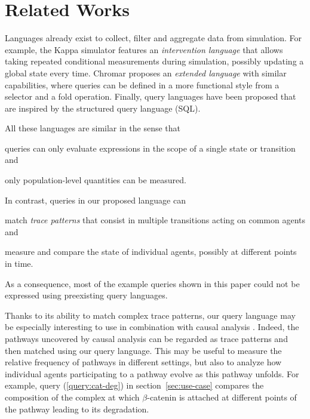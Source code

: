 \section{Related Works}

Languages already exist to collect, filter and aggregate data from
simulation. For example, the Kappa simulator \cite{BoutillierEK17}
features an \emph{intervention language} that allows taking repeated
conditional measurements during simulation, possibly updating a global
state every time. Chromar \cite{honorato2017chromar} proposes an
\emph{extended language} with similar capabilities, where queries can
be defined in a more functional style from a selector and a fold
operation. Finally, query languages have been proposed
\cite{helms2012toward,zehe2016online} that are inspired by the
{structured query language} (\textsc{SQL}).

All these languages are similar in the sense that
\begin{inparaenum}[(i)]
\item queries can only evaluate expressions in the scope of a single
state or transition and
\item only population-level quantities can be measured.
\end{inparaenum}
In contrast, queries in our proposed language can
\begin{inparaenum}[(i)]
\item match \emph{trace patterns} that consist in multiple transitions
  acting on common agents and
\item measure and compare the state of individual agents, possibly at
  different points in time.
\end{inparaenum}
As a consequence, most of the example queries shown in this paper
could not be expressed using preexisting query languages.

Thanks to its ability to match complex trace patterns, our query
language may be especially interesting to use in combination with
causal analysis
\cite{DanosEtAl-CONCUR07,DBLP:conf/fsttcs/DanosFFHH12}. Indeed, the
pathways uncovered by causal analysis can be regarded as trace
patterns and then matched using our query language. This may be useful
to measure the relative frequency of pathways in different settings,
but also to analyze how individual agents participating to a pathway
evolve as this pathway unfolds. For example, query
(\ref{query:cat-deg}) in section~\ref{sec:use-case} compares the
composition of the complex at which $\beta$-catenin is attached at
different points of the pathway leading to its degradation.
